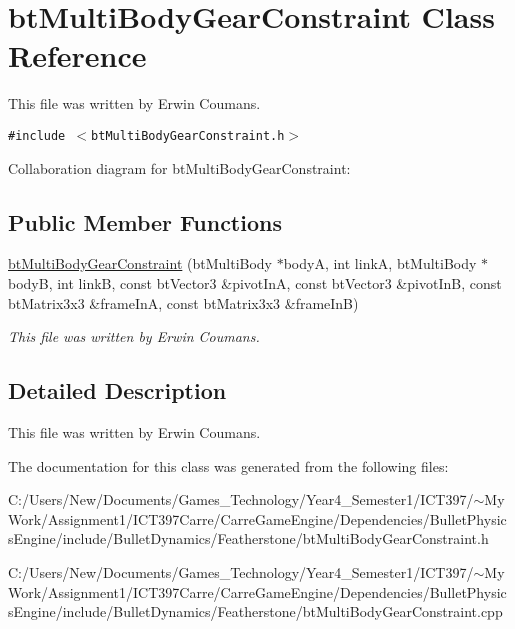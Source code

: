 \hypertarget{classbt_multi_body_gear_constraint}{
\section{btMultiBodyGearConstraint Class Reference}
\label{classbt_multi_body_gear_constraint}
}
This file was written by Erwin Coumans.  


{\tt \#include $<$btMultiBodyGearConstraint.h$>$}

Collaboration diagram for btMultiBodyGearConstraint:\subsection*{Public Member Functions}
\begin{CompactItemize}
\item 
\hypertarget{classbt_multi_body_gear_constraint_9c4d40e6e77a31a818287620504cab76}{
\hyperlink{classbt_multi_body_gear_constraint_9c4d40e6e77a31a818287620504cab76}{btMultiBodyGearConstraint} (btMultiBody $\ast$bodyA, int linkA, btMultiBody $\ast$bodyB, int linkB, const btVector3 \&pivotInA, const btVector3 \&pivotInB, const btMatrix3x3 \&frameInA, const btMatrix3x3 \&frameInB)}
\label{classbt_multi_body_gear_constraint_9c4d40e6e77a31a818287620504cab76}

\begin{CompactList}\small\item\em This file was written by Erwin Coumans. \item\end{CompactList}\end{CompactItemize}


\subsection{Detailed Description}
This file was written by Erwin Coumans. 

The documentation for this class was generated from the following files:\begin{CompactItemize}
\item 
C:/Users/New/Documents/Games\_\-Technology/Year4\_\-Semester1/ICT397/$\sim$My Work/Assignment1/ICT397Carre/CarreGameEngine/Dependencies/BulletPhysicsEngine/include/BulletDynamics/Featherstone/btMultiBodyGearConstraint.h\item 
C:/Users/New/Documents/Games\_\-Technology/Year4\_\-Semester1/ICT397/$\sim$My Work/Assignment1/ICT397Carre/CarreGameEngine/Dependencies/BulletPhysicsEngine/include/BulletDynamics/Featherstone/btMultiBodyGearConstraint.cpp\end{CompactItemize}
